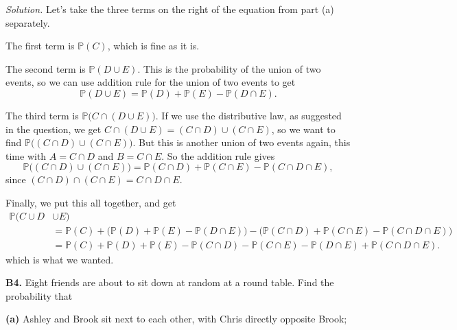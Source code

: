 \documentclass[
  a4paper,
]{book}
\theoremstyle{definition}
\theoremstyle{definition}
\theoremstyle{definition}
\theoremstyle{definition}
\theoremstyle{remark}
\begin{document}
\begin{myanswers}
\emph{Solution.}
Let's take the three terms on the right of the equation from part (a) separately.

The first term is \(\mathbb P(C)\), which is fine as it is.

The second term is \(\mathbb P(D \cup E)\). This is the probability of the union of two events, so we can use addition rule for the union of two events to get
\[ \mathbb P(D \cup E) = \mathbb P(D) + \mathbb P(E) - \mathbb P(D \cap E) . \]

The third term is \(\mathbb P\big(C \cap (D \cup E)\big)\). If we use the distributive law, as suggested in the question, we get \(C \cap (D \cup E) = (C \cap D) \cup (C\cap E)\), so we want to find \(\mathbb P\big((C \cap D) \cup (C\cap E)\big)\). But this is another union of two events again, this time with \(A = C \cap D\) and \(B = C \cap E\). So the addition rule gives
\[ \mathbb P\big((C \cap D) \cup (C\cap E)\big) = \mathbb P(C \cap D) + \mathbb P(C \cap E) - \mathbb P(C \cap D \cap E) , \]
since \((C \cap D) \cap (C \cap E) = C \cap D \cap E\).

Finally, we put this all together, and get
\begin{align*}
  \mathbb P(C \cup D &\cup E) \\
  &= \mathbb P(C) + \big(\mathbb P(D) + \mathbb P(E) - \mathbb P(D \cap E)\big) - \big(\mathbb P(C \cap D) + \mathbb P(C \cap E) - \mathbb P(C \cap D \cap E)\big) \\
  &= \mathbb P(C) + \mathbb P(D) + \mathbb P(E) - \mathbb P(C \cap D) - \mathbb P(C \cap E) - \mathbb P(D \cap E) + \mathbb P(C \cap D \cap E) . 
\end{align*}
which is what we wanted.

\end{myanswers}

\textbf{B4.} Eight friends are about to sit down at random at a round table. Find the probability that

\textbf{(a)} Ashley and Brook sit next to each other, with Chris directly opposite Brook;
\end{document}
